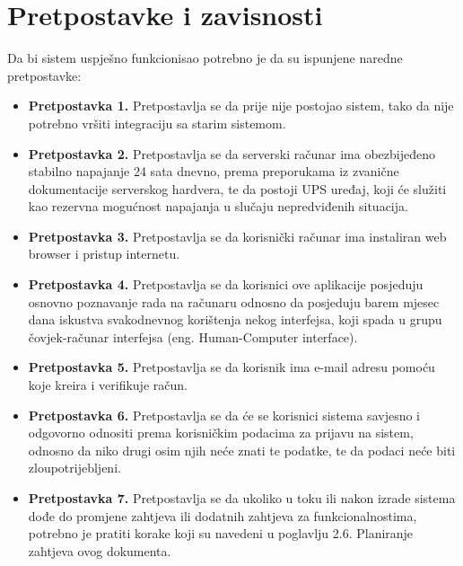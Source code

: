 \section{Pretpostavke i zavisnosti}
Da bi sistem uspješno funkcionisao potrebno je da su ispunjene naredne pretpostavke:
\begin{itemize}
    \item \textbf{Pretpostavka 1.} Pretpostavlja se da prije nije postojao sistem, tako da nije potrebno vršiti integraciju sa starim sistemom. 
    \item \textbf{Pretpostavka 2.} Pretpostavlja se da serverski računar ima obezbijeđeno stabilno napajanje 24 sata dnevno, prema preporukama iz zvanične dokumentacije serverskog hardvera, te da postoji UPS uređaj, koji će služiti kao rezervna mogućnost napajanja u slučaju nepredviđenih situacija.
    \item \textbf{Pretpostavka 3.} Pretpostavlja se da korisnički računar ima instaliran web browser i pristup internetu.
    \item \textbf{Pretpostavka 4.} Pretpostavlja se da korisnici ove aplikacije posjeduju osnovno poznavanje rada na računaru odnosno da posjeduju barem mjesec dana iskustva svakodnevnog korištenja nekog interfejsa, koji spada u grupu čovjek-računar interfejsa (eng. Human-Computer interface).
    \item \textbf{Pretpostavka 5.} Pretpostavlja se da  korisnik ima e-mail adresu pomoću koje kreira i verifikuje račun.
    \item \textbf{Pretpostavka 6.} Pretpostavlja se da će se korisnici sistema savjesno i odgovorno odnositi prema korisničkim podacima za prijavu na sistem, odnosno da niko drugi osim njih neće znati te podatke, te da podaci neće biti zloupotrijebljeni.
    \item \textbf{Pretpostavka 7.} Pretpostavlja se da ukoliko u toku ili nakon izrade sistema dođe do promjene zahtjeva ili dodatnih zahtjeva za funkcionalnostima, potrebno je pratiti korake koji su navedeni u poglavlju 2.6. Planiranje zahtjeva ovog dokumenta.
\end{itemize}

